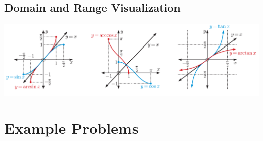 \documentclass{article}
\begin{document}
\subsection*{Domain and Range Visualization}

\begin{center}
\includegraphics[width=\textwidth]{Screenshot 2024-05-14 192525.png}
\end{center}

\section*{Example Problems}
\end{document}
